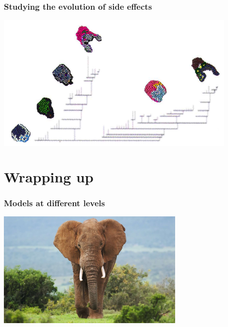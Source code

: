 \documentclass[compress]{beamer}
\begin{document}
\begin{frame}
\frametitle{Studying the evolution of side effects}   
\begin{center}
     \includegraphics[width=0.9\textwidth]{figures/hogeweg_replaytape.png}\\
    \end{center}
\end{frame}

\section{Wrapping up}

\begin{frame}
\frametitle{Models at different levels}   
\begin{center}
     \includegraphics[width=0.7\textwidth]{figures/elephant.jpg}\\
    \end{center}
\end{frame}
\end{document}
